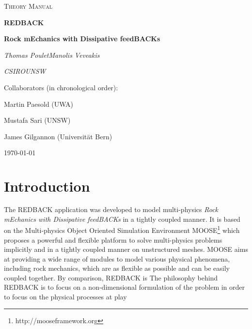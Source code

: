 \documentclass[]{scrreprt}
\newcommand{\moose}{{MOOSE}}
\newcommand{\redback}{{REDBACK}}
\begin{document}
\newif\ifshowallderivations %
\showallderivationstrue

\begin{titlepage}
	\centering
	{\scshape\LARGE Theory Manual \par}
	\vspace{1cm}
	\vspace{1.5cm}
	{\Huge\bfseries \redback{} \par}
	\vspace{0.5cm}
	{\large\bfseries Rock mEchanics with Dissipative feedBACKs\par}
	\vspace{2cm}
	{\Large\itshape Thomas Poulet\hspace{2cm}Manolis Veveakis\par}
	\vspace{0.5cm}
	{\Large\itshape CSIRO\hspace{4cm}UNSW\par}
	\vfill
	Collaborators (in chronological order):\par
	Martin Paesold (UWA) \par
	Mustafa Sari (UNSW) \par
	James Gilgannon (Universit\"{a}t Bern)

	\vfill

	{\large \today\par}
\end{titlepage}

%	

\tableofcontents

\chapter{Introduction}

The \redback{} application was developed to model multi-physics \textit{Rock mEchanics with
Dissipative feedBACKs} in a tightly coupled manner. It is based on the Multi-physics Object Oriented Simulation Environment \moose{}\footnote{http://mooseframework.org} \citep{Gaston2009} which proposes a powerful and flexible platform to solve multi-physics problems implicitly and in a tightly coupled manner on unstructured meshes. \moose{} aims at providing a wide range of modules to model various physical phenomena, including rock mechanics, which are as flexible as possible and can be easily coupled together. By comparison, \redback{} is  
The philosophy behind \redback{} is to focus on a non-dimensional formulation of the problem in order to focus on the physical processes at play
\end{document}
